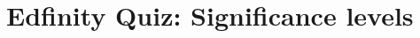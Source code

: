 \documentclass[t,compress,mathserif]{beamer}
\begin{document}

\section{Edfinity Quiz: Significance levels}














\end{document}
